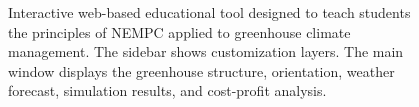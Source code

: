 \documentclass[conference]{IEEEtran}
\begin{document}
\begin{figure}\label{fig:web}
    \centering
    \caption{Interactive web-based educational tool designed to teach students the principles of NEMPC applied to greenhouse climate management. The sidebar shows customization layers. The main window displays the greenhouse structure, orientation, weather forecast, simulation results, and cost-profit analysis.}
\end{figure}
\end{document}
